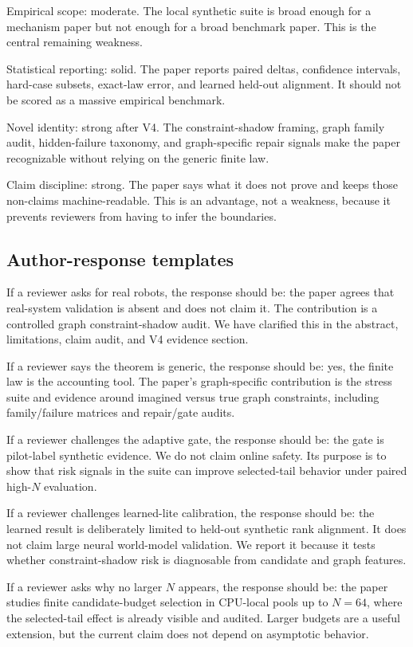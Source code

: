 \documentclass{article}
\begin{document}
Empirical scope: moderate.  The local synthetic suite is broad enough for a
mechanism paper but not enough for a broad benchmark paper.  This is the central
remaining weakness.

Statistical reporting: solid.  The paper reports paired deltas, confidence
intervals, hard-case subsets, exact-law error, and learned held-out alignment.
It should not be scored as a massive empirical benchmark.

Novel identity: strong after V4.  The constraint-shadow framing, graph family
audit, hidden-failure taxonomy, and graph-specific repair signals make the paper
recognizable without relying on the generic finite law.

Claim discipline: strong.  The paper says what it does not prove and keeps those
non-claims machine-readable.  This is an advantage, not a weakness, because it
prevents reviewers from having to infer the boundaries.

\subsection{Author-response templates}

If a reviewer asks for real robots, the response should be: the paper agrees
that real-system validation is absent and does not claim it.  The contribution
is a controlled graph constraint-shadow audit.  We have clarified this in the
abstract, limitations, claim audit, and V4 evidence section.

If a reviewer says the theorem is generic, the response should be: yes, the
finite law is the accounting tool.  The paper's graph-specific contribution is
the stress suite and evidence around imagined versus true graph constraints,
including family/failure matrices and repair/gate audits.

If a reviewer challenges the adaptive gate, the response should be: the gate is
pilot-label synthetic evidence.  We do not claim online safety.  Its purpose is
to show that risk signals in the suite can improve selected-tail behavior under
paired high-\(N\) evaluation.

If a reviewer challenges learned-lite calibration, the response should be: the
learned result is deliberately limited to held-out synthetic rank alignment.  It
does not claim large neural world-model validation.  We report it because it
tests whether constraint-shadow risk is diagnosable from candidate and graph
features.

If a reviewer asks why no larger \(N\) appears, the response should be: the
paper studies finite candidate-budget selection in CPU-local pools up to
\(N=64\), where the selected-tail effect is already visible and audited.  Larger
budgets are a useful extension, but the current claim does not depend on
asymptotic behavior.
\end{document}
